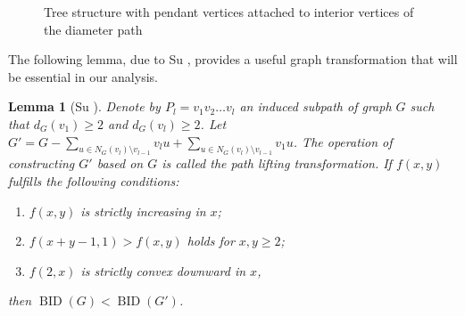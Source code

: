 \documentclass[12pt]{article}
\newtheorem{lemma}[theorem]{Lemma}
\theoremstyle{definition}
\newcommand{\BID}{\operatorname{BID}}
\begin{document}
\begin{figure}[h]
\centering
{}
\caption{Tree structure with pendant vertices attached to interior vertices of the diameter path}
\label{fig:tree_structure}
\end{figure}

The following lemma, due to Su \cite{su2025extremal}, provides a useful graph transformation that will be essential in our analysis.

\begin{lemma}[Su \cite{su2025extremal}]
\label{lem:lifting}
Denote by \(P_l = v_1v_2\ldots v_l\) an induced subpath of graph \(G\) such that \(d_G(v_1) \geq 2\) and \(d_G(v_l) \geq 2\). Let \(G' = G - \sum_{u \in N_G(v_l)\setminus v_{l-1}} v_l u + \sum_{u \in N_G(v_l)\setminus v_{l-1}} v_1 u\). The operation of constructing \(G'\) based on \(G\) is called the path lifting transformation. If \(f(x,y)\) fulfills the following conditions:
\begin{enumerate}[label=(\roman*)]
\item \(f(x,y)\) is strictly increasing in \(x\);
\item \(f(x+y-1,1) > f(x,y)\) holds for \(x,y \geq 2\);
\item \(f(2,x)\) is strictly convex downward in \(x\),
\end{enumerate}
then \(\BID(G) < \BID(G')\).
\end{lemma}
\end{document}
